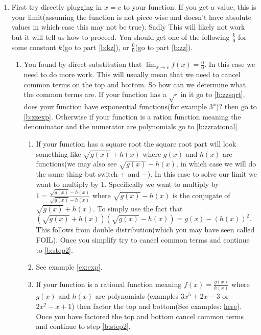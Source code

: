 \documentclass[12pt]{article}
\begin{document}
\begin{enumerate}
    \item \label{b:step1} First try directly plugging in $x=c$ to your function. If you get a value, this is your limit(assuming the function is not piece wise and doesn't have absolute values in which case this may not be true). Sadly This will likely not work but it will tell us how to proceed. You should get one of the following $\frac{k}{0}$ for some constant $k$(go to part \ref{b:kz}), or $\frac{0}{0}$(go to part \ref{b:zz}).
    \begin{enumerate}[label=\alph*.]
        \item \label{b:zz} You found by direct substitution that $\displaystyle{\lim_{x\to c}f(x)}=\frac{0}{0}$. In this case we need to do more work. This will usually mean that we need to cancel common terms on the top and bottom. So how can we determine what the common terms are. If your function has a $\sqrt{\cdot}$ in it go to \ref{b:zzsqrt}, does your function have exponential functions(for example $3^x$)? then go to \ref{b:zzexp}. Otherwise if your function is a ration function meaning the denominator and the numerator are polynomials go to \ref{b:zzrational}
        \begin{enumerate}[label=\roman*.]
            \item \label{b:zzsqrt}
                If your function has a square root the square root part will look something like $\sqrt{g(x)}+ h(x)$ where $g(x)$ and $h(x)$ are functions(we may also see $\sqrt{g(x)}- h(x)$, in which case we will do the same thing but switch $+$ and $-$). In this case to solve our limit we want to multiply by $1$. Specifically we want to multiply by $1=\frac{\sqrt{g(x)}- h(x)}{\sqrt{g(x)}- h(x)}$ where $\sqrt{g(x)}- h(x)$ is the conjugate of $\sqrt{g(x)}+ h(x)$. To simply use the fact that $(\sqrt{g(x)}+ h(x))(\sqrt{g(x)}- h(x))=g(x)- (h(x))^2$. This follows from double distribution(which you may have seen called FOIL). Once you simplify try to cancel common terms and continue to \ref{b:step2}.\\
            \item \label{b:zzexp}
                See example \ref{ex:exp}.\\
            \item \label{b:zzrational}
                If your function is a rational function meaning $f(x)=\frac{g(x)}{h(x)}$ where $g(x)$ and $h(x)$ are polynomials (examples $3x^5+2x-3$ or $2x^2-x+1$) then factor the top and bottom(See examples: \href{https://tutorial.math.lamar.edu/problems/alg/factoring.aspx}{here}). Once you have factored the top and bottom cancel common terms and continue to step \ref{b:step2}.\\
        \end{enumerate}


\end{enumerate}
\end{enumerate}
\end{document}
